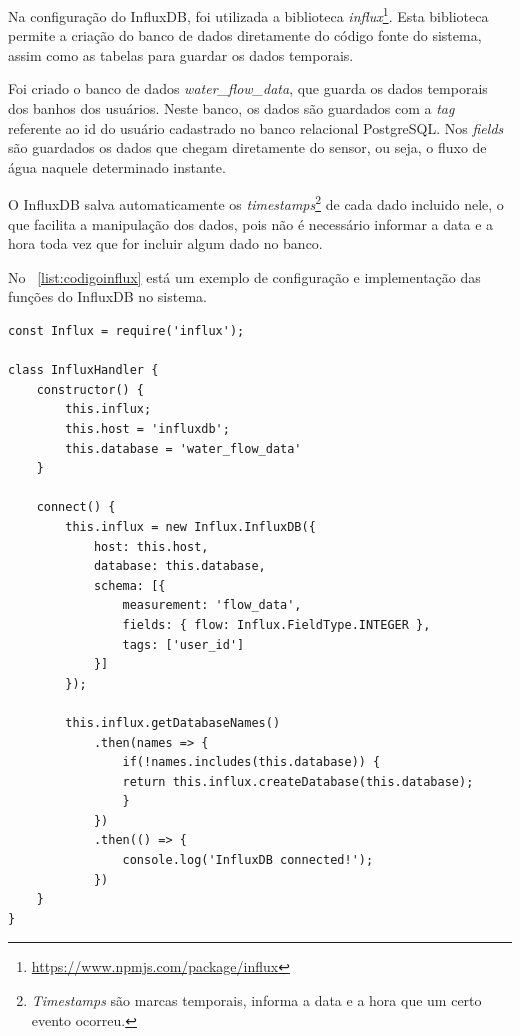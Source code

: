 Na configuração do InfluxDB, foi utilizada a biblioteca \textit{influx}\footnote{\url{https://www.npmjs.com/package/influx}}. Esta biblioteca permite a criação do banco de dados diretamente do código fonte do sistema, assim como as tabelas para guardar os dados temporais.

Foi criado o banco de dados \textit{water\_flow\_data}, que guarda os dados temporais dos banhos dos usuários. Neste banco, os dados são guardados com a \textit{tag} referente ao id do usuário cadastrado no banco relacional PostgreSQL. Nos \textit{fields} são guardados os dados que chegam diretamente do sensor, ou seja, o fluxo de água naquele determinado instante.

O InfluxDB salva automaticamente os \textit{timestamps}\footnote{\textit{Timestamps} são marcas temporais, informa a data e a hora que um certo evento ocorreu.} de cada dado incluido nele, o que facilita a manipulação dos dados, pois não é necessário informar a data e a hora toda vez que for incluir algum dado no banco.

No \lstlistingname\ \ref{list:codigoinflux} está um exemplo de configuração e implementação das funções do InfluxDB no sistema.

\newpage


\begin{lstlisting}[label=list:codigoinflux, caption=Exemplo do código de configuração do InfluxDB]
const Influx = require('influx');

class InfluxHandler {
	constructor() {
		this.influx;
		this.host = 'influxdb';
		this.database = 'water_flow_data'
	}
	
	connect() {
		this.influx = new Influx.InfluxDB({
			host: this.host,
			database: this.database,
			schema: [{
				measurement: 'flow_data',
				fields: { flow: Influx.FieldType.INTEGER },
				tags: ['user_id']
			}]
		});
		
		this.influx.getDatabaseNames()
			.then(names => {
				if(!names.includes(this.database)) {
				return this.influx.createDatabase(this.database);
				}
			})
			.then(() => {
				console.log('InfluxDB connected!');
			})
	}
}
\end{lstlisting}

\newpage

